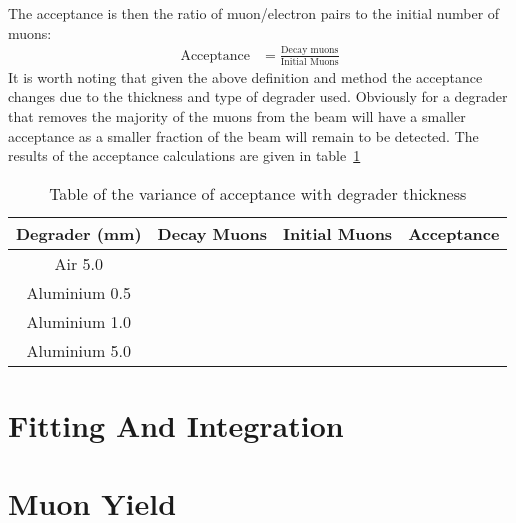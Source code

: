 \documentclass[]{article}
\begin{document}
The acceptance is then the ratio of muon/electron pairs to the initial number of muons:
\begin{align}
    \text{Acceptance} &= \frac{\text{Decay muons}}{\text{Initial Muons}} \label{equ:acceptance}
\end{align}
It is worth noting that given the above definition and method the acceptance changes due to the thickness and type of degrader used. Obviously for a degrader that removes the majority of the muons from the beam will have a smaller acceptance as a smaller fraction of the beam will remain to be detected. The results of the acceptance calculations are given in table~\ref{tab:acceptance}
\begin{table}
    \begin{center}
    \begin{tabular}{c| r@{ $\pm$ }l | r@{ $\pm$ }l | r@{ $\pm$ }l }
        Degrader (mm) & \multicolumn{2}{|c}{Decay Muons} & \multicolumn{2}{|c}{Initial Muons} & \multicolumn{2}{|c}{Acceptance}\\
        \hline
        Air 5.0       &   &   &   &   &   &   \\
        Aluminium 0.5 &   &   &   &   &   &   \\
        Aluminium 1.0 &   &   &   &   &   &   \\
        Aluminium 5.0 &   &   &   &   &   &   \\
    \end{tabular}
    \end{center}
    \caption{Table of the variance of acceptance with degrader thickness}
    \label{tab:acceptance}
\end{table}
\section{Fitting And Integration} %
\label{sec:fitting_and_integration}

\section{Muon Yield} %
\label{sec:muon_yield}

\appendix
\end{document}
